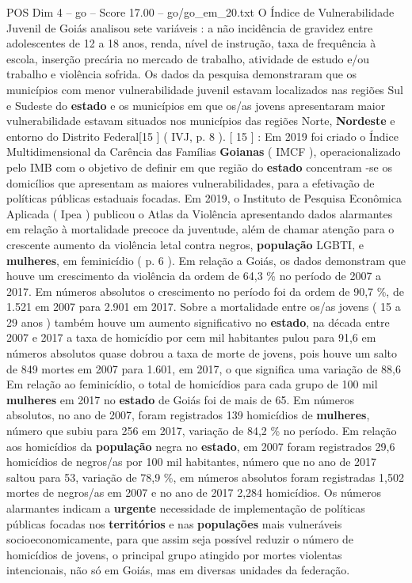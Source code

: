 \begin{textsample}{POS Dim 4 – go – Score 17.00 – go/go\_em\_20.txt}
O Índice de Vulnerabilidade Juvenil de Goiás analisou sete variáveis : a não incidência de gravidez entre adolescentes de 12 a 18 anos, renda, nível de instrução, taxa de frequência à escola, inserção precária no mercado de trabalho, atividade de estudo e/ou trabalho e violência sofrida.
Os dados da pesquisa demonstraram que os municípios com menor vulnerabilidade juvenil estavam localizados nas regiões Sul e Sudeste do \textbf{estado} e os municípios em que os/as jovens apresentaram maior vulnerabilidade estavam situados nos municípios das regiões Norte, \textbf{Nordeste} e entorno do Distrito Federal[15 ] ( IVJ, p. 8 ). [ 15 ] : Em 2019 foi criado o Índice Multidimensional da Carência das Famílias \textbf{Goianas} ( IMCF ), operacionalizado pelo IMB com o objetivo de definir em que região do \textbf{estado} concentram -se os domicílios que apresentam as maiores vulnerabilidades, para a efetivação de políticas públicas estaduais focadas.
Em 2019, o Instituto de Pesquisa Econômica Aplicada ( Ipea ) publicou o Atlas da Violência apresentando dados alarmantes em relação à mortalidade precoce da juventude, além de chamar atenção para o crescente aumento da violência letal contra negros, \textbf{população} LGBTI, e \textbf{mulheres}, em feminicídio ( p. 6 ).
Em relação a Goiás, os dados demonstram que houve um crescimento da violência da ordem de 64,3 \% no período de 2007 a 2017.
Em números absolutos o crescimento no período foi da ordem de 90,7 \%, de 1.521 em 2007 para 2.901 em 2017.
Sobre a mortalidade entre os/as jovens ( 15 a 29 anos ) também houve um aumento significativo no \textbf{estado}, na década entre 2007 e 2017 a taxa de homicídio por cem mil habitantes pulou para 91,6 em números absolutos quase dobrou a taxa de morte de jovens, pois houve um salto de 849 mortes em 2007 para 1.601, em 2017, o que significa uma variação de 88,6 Em relação ao feminicídio, o total de homicídios para cada grupo de 100 mil \textbf{mulheres} em 2017 no \textbf{estado} de Goiás foi de mais de 65.
Em números absolutos, no ano de 2007, foram registrados 139 homicídios de \textbf{mulheres}, número que subiu para 256 em 2017, variação de 84,2 \% no período.
Em relação aos homicídios da \textbf{população} negra no \textbf{estado}, em 2007 foram registrados 29,6 homicídios de negros/as por 100 mil habitantes, número que no ano de 2017 saltou para 53, variação de 78,9 \%, em números absolutos foram registradas 1,502 mortes de negros/as em 2007 e no ano de 2017 2,284 homicídios.
Os números alarmantes indicam a \textbf{urgente} necessidade de implementação de políticas públicas focadas nos \textbf{territórios} e nas \textbf{populações} mais vulneráveis socioeconomicamente, para que assim seja possível reduzir o número de homicídios de jovens, o principal grupo atingido por mortes violentas intencionais, não só em Goiás, mas em diversas unidades da federação.

\end{textsample}
